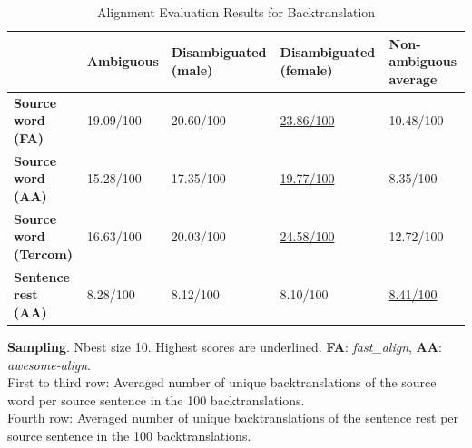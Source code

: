 \begin{table}[!htb]
    \ContinuedFloat 

    \begin{subtable}{\textwidth}
        \centering
        \begin{tabularx}{\linewidth}{|X|XXXX|}
            \hline
             & \textbf{Ambiguous} & \textbf{Disambiguated (male)} & \textbf{Disambiguated (female)} & \textbf{Non-ambiguous average} \\ \hline
             \textbf{Source word (FA)} & 19.09/100 & 20.60/100 & \underline{23.86/100} & 10.48/100 \\ 
             \textbf{Source word (AA)} & 15.28/100 & 17.35/100 & \underline{19.77/100} & 8.35/100 \\ 
             \textbf{Source word (Tercom)} & 16.63/100 & 20.03/100 & \underline{24.58/100} & 12.72/100 \\ \hline
             \textbf{Sentence rest (AA)} & 8.28/100 & 8.12/100 & 8.10/100 & \underline{8.41/100} \\ \hline
        \end{tabularx}
        \caption{\textbf{Sampling}. Nbest size 10. Highest scores are underlined. \textbf{FA}: \textit{fast\_align}, \textbf{AA}: \textit{awesome-align}. \\ First to third row: Averaged number of unique backtranslations of the source word per source sentence in the 100 backtranslations. \\ Fourth row: Averaged number of unique backtranslations of the sentence rest per source sentence in the 100 backtranslations.}
        \label{tab:alignment_backtranslation_sampling}
    \end{subtable}

    \caption{Alignment Evaluation Results for Backtranslation}
    \label{tab:alignment_backtranslation}
\end{table}

